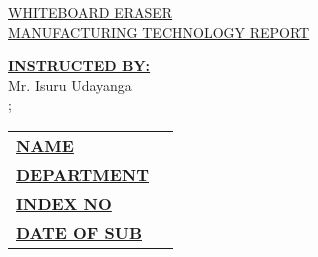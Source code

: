 \documentclass[12pt,a4paper,oneside]{article}
\begin{document}
\begin{titlepage}


    \begin{flushright}
    \end{flushright}


    \vspace*{\fill}
    \begin{center}
        \uppercase{\fontsize{30}{45}\selectfont \ul{Whiteboard Eraser}}\\
        \uppercase{\fontsize{20}{30}\selectfont \ul{Manufacturing Technology Report}}
    \end{center}
    \vfill %


    \begin{multicols}{2}
        \noindent\textbf{\underline{INSTRUCTED BY:}} \\ Mr. Isuru Udayanga\\

        \columnbreak;


        \begin{tabular}{ll}
            \vspace{6pt}

            \textbf{\uppercase{\underline{Name}}}       &
            \textbf{\uppercase{\fontsize{12}{18} \selectfont {:}}}
            {\fontsize{12}{18} \selectfont {B Gnanakeethan}}      \\

            \vspace{6pt}
            \textbf{\uppercase{\underline{Department}}} &
            \textbf{\uppercase{\fontsize{12}{18} \selectfont {:}}}
            {\fontsize{12}{18} \selectfont {Engineering Tech.}}\\

            \vspace{6pt}
            \textbf{\uppercase{\underline{Index No}}}   &
            \textbf{\uppercase{\fontsize{12}{18} \selectfont {:}}}
            {\fontsize{12}{18} \selectfont {EGT/16/00037}}  \\

            \vspace{6pt}
            \textbf{\uppercase{\underline{Date of Sub}}}   &
            \textbf{\uppercase{\fontsize{12}{18} \selectfont {:}}}
            {\fontsize{12}{18} \selectfont {14/12/2018}}  \\

        \end{tabular}
    \end{multicols}

\end{titlepage}
\end{document}
